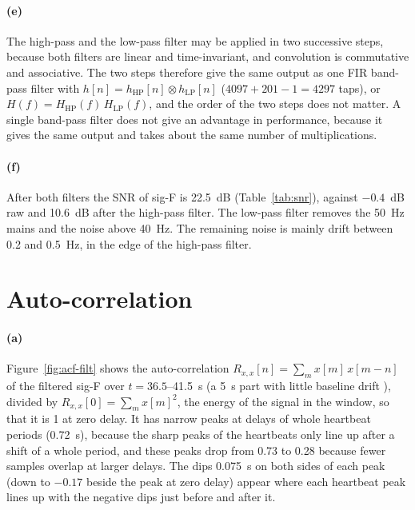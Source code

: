 \documentclass[11pt,a4paper]{article}
\begin{document}
\paragraph{(e)} The high-pass and the low-pass filter may be applied in two successive steps,
because both filters are linear and time-invariant, and convolution is commutative and
associative. The two steps therefore give the same output as one FIR band-pass filter with
$h[n] = h_\mathrm{HP}[n] \otimes h_\mathrm{LP}[n]$ ($4097 + 201 - 1 = 4297$ taps), or
$H(f) = H_\mathrm{HP}(f)\,H_\mathrm{LP}(f)$, and the order of the two steps does not matter.
A single band-pass filter does not give an advantage in performance, because it gives the same
output and takes about the same number of multiplications.

\paragraph{(f)} After both filters the SNR of sig-F is 22.5~dB (Table~\ref{tab:snr}), against
$-0.4$~dB raw and 10.6~dB after the high-pass filter. The low-pass filter removes the 50~Hz mains
and the noise above 40~Hz. The remaining noise is mainly drift between 0.2 and 0.5~Hz, in the
edge of the high-pass filter.
\clearpage

\section{Auto-correlation}\label{sec:acf}
\paragraph{(a)} Figure~\ref{fig:acf-filt} shows the auto-correlation $R_{x,x}[n] = \sum_m x[m]\,x[m-n]$ of the filtered
sig-F over $t = 36.5$--41.5~s (a 5~s part with little baseline drift ),
divided by $R_{x,x}[0] = \sum_m x[m]^2$, the energy of the signal in the window, so that it is 1
at zero delay. It has
narrow peaks at delays of whole heartbeat periods (0.72~s), because the sharp peaks of the
heartbeats only line up after a shift of a whole period, and these peaks drop from 0.73 to 0.28
because fewer samples overlap at larger delays. The dips 0.075~s on both sides of each peak (down
to $-0.17$ beside the peak at zero delay) appear where each heartbeat peak lines up with the
negative dips just before and after it.
\end{document}
